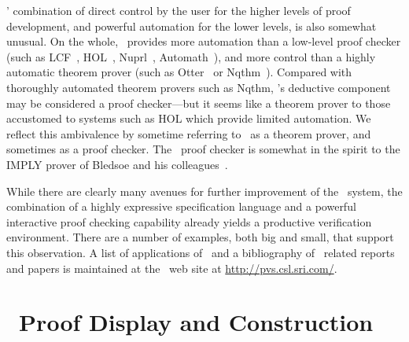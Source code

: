 \documentclass[12pt,twoside]{book}
\begin{document}
\pvs' combination of direct control by the user for the higher
levels of 
proof development, and powerful automation for the lower levels,  is
also somewhat 
unusual.  On the whole, \pvs\ provides more automation than a low-level
proof checker (such as LCF~\cite{LCF},
HOL~\cite{Gordon:HOL88}, Nuprl~\cite{Nuprl-book},
Automath~\cite{deBruijn80}), and more control than a
highly automatic theorem prover (such as 
Otter~\cite{Otter90} or 
Nqthm~\cite{Boyer-Moore79,Boyer-Moore88}).  Compared with
thoroughly automated theorem provers such as Nqthm, \pvs's
deductive component may be considered a proof checker---but it seems like
a theorem prover to those accustomed to systems such as HOL
which provide limited automation.  We reflect this ambivalence by sometime
referring to \pvs\ as a theorem prover, and sometimes as a proof checker.
The \pvs\ proof checker is somewhat in the spirit to the
IMPLY prover of Bledsoe and his
colleagues~\cite{Bledsoe74}.

While there are clearly many avenues for further improvement of the \pvs\
system, the combination of a highly expressive specification language and
a powerful interactive proof checking capability already  yields a
productive verification environment.  There are a number of examples, both
big and small, that support this observation.  A list of applications
of \pvs\ and a bibliography of \pvs\ related reports and papers is
maintained at the \pvs\ web site at \url{http://pvs.csl.sri.com/}.



\section{\pvs\ Proof Display and Construction}
\end{document}
